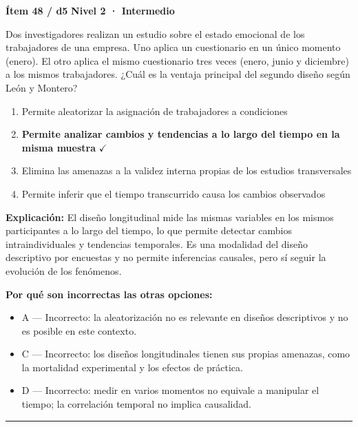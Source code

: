 \documentclass[12pt,a4paper]{article}
\begin{document}
\begin{mdframed}[backgroundcolor=fondogris,linecolor=ambar,linewidth=1pt,innerleftmargin=10pt,innerrightmargin=10pt,innertopmargin=7pt,innerbottommargin=7pt]
\textbf{Ítem 48 / d5} \hfill {\small\bfseries\color{ambar} Nivel 2 · Intermedio}
\end{mdframed}

Dos investigadores realizan un estudio sobre el estado emocional de los trabajadores de una empresa. Uno aplica un cuestionario en un único momento (enero). El otro aplica el mismo cuestionario tres veces (enero, junio y diciembre) a los mismos trabajadores. ¿Cuál es la ventaja principal del segundo diseño según León y Montero?

\begin{enumerate}
  \item[A.] Permite aleatorizar la asignación de trabajadores a condiciones
  \item[\textbf{\color{verde}B.}] \textbf{\color{verde} Permite analizar cambios y tendencias a lo largo del tiempo en la misma muestra} \hfill $\checkmark$
  \item[C.] Elimina las amenazas a la validez interna propias de los estudios transversales
  \item[D.] Permite inferir que el tiempo transcurrido causa los cambios observados
\end{enumerate}

\noindent\textbf{\color{azul}Explicación:} El diseño longitudinal mide las mismas variables en los mismos participantes a lo largo del tiempo, lo que permite detectar cambios intraindividuales y tendencias temporales. Es una modalidad del diseño descriptivo por encuestas y no permite inferencias causales, pero sí seguir la evolución de los fenómenos.

\noindent\textbf{\color{gris}Por qué son incorrectas las otras opciones:}
\begin{itemize}
  \item {\small A — Incorrecto: la aleatorización no es relevante en diseños descriptivos y no es posible en este contexto.}
  \item {\small C — Incorrecto: los diseños longitudinales tienen sus propias amenazas, como la mortalidad experimental y los efectos de práctica.}
  \item {\small D — Incorrecto: medir en varios momentos no equivale a manipular el tiempo; la correlación temporal no implica causalidad.}
\end{itemize}
\vspace{8pt}\hrule\vspace{10pt}
\end{document}
